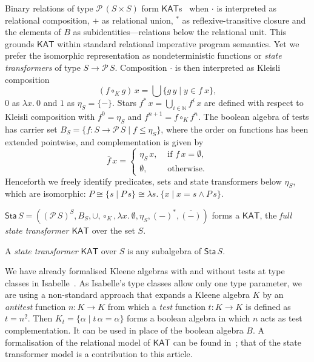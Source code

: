 \documentclass[envcountsame]{llncs}
\newcommand{\KAT}{\mathsf{KAT}}
\newcommand{\Pow}{\mathcal{P}}
\newcommand{\sta}{\mathsf{Sta}}
\begin{document}
Binary relations of type $\Pow\, (S\times S)$ form
$\KAT$s~\cite{Kozen97} when $\cdot$ is interpreted as relational
composition, $+$ as relational union, $^\ast$ as reflexive-transitive
closure and the elements of $B$ as subidentities---relations below the
relational unit. This grounds $\KAT$ within standard relational
imperative program semantics. Yet we prefer the isomorphic
representation as nondeterministic functions or \emph{state
  transformers} of type $S\to \Pow\, S$.  Composition $\cdot$ is then
interpreted as Kleisli composition
\begin{equation*} 
(f\circ_K g)\, x = \bigcup\{g\, y\mid y \in f\ x \}, 
\end{equation*} 
$0$ as $\lambda x.\ 0$ and $1$ as $\eta_S = \{-\}$.  Stars
$f^{\ast}\, x = \bigcup_{i\in\mathbb{N}} f^i\, x$ are defined with
  respect to Kleisli composition with $f^{0} = \eta_S$ and
  $f^{n+1} = f \circ_K f^{n}$. The boolean algebra of tests has
  carrier set $B_S=\{f:S\to \Pow\, S \mid f\le \eta_S\}$, where the
  order on functions has been extended pointwise,  and complementation
  is given by
  \begin{equation*} 
    \overline{f}\, x =
  \begin{cases}
    \eta_S\, x, & \text{ if } f\, x = \emptyset,\\
\emptyset, & \text{ otherwise}.
  \end{cases}
\end{equation*}
Henceforth we freely identify predicates, sets and state 
transformers below $\eta_S$, which are isomorphic:
$P\cong \{s\mid P\, s\}\cong \lambda s.\ \{x\mid x=s \land P\, s\}$.

\begin{proposition}\label{P:kleisli-ka}
$\sta\, S = ((\Pow\, S)^S,B_S,\cup,\circ_K,\lambda x.\
  \emptyset, \eta_S,(-)^{\ast},\overline{(-)})$
  forms a $\KAT$, the \emph{full state transformer $\KAT$} over the
  set $S$.
\end{proposition}
A \emph{state transformer $\KAT$} over $S$ is any subalgebra of
$\sta\, S$. 

We have already formalised Kleene algebras with and without tests at
type classes in Isabelle~\cite{afp:ka,afp:kat}.  As Isabelle's type
classes allow only one type parameter, we are using a non-standard
approach that expands a Kleene algebra $K$ by an \emph{antitest}
function $n:K\to K$ from which a \emph{test} function $t:K\to K$ is
defined as $t=n^2$. Then $K_t = \{\alpha \mid t\, \alpha = \alpha\}$
forms a boolean algebra in which $n$ acts as test complementation. It
can be used in place of the boolean algebra $B$.  A formalisation of
the relational model of $\KAT$ can be found in~\cite{afp:kat}; that of
the state transformer model is a contribution to this article.
\end{document}
